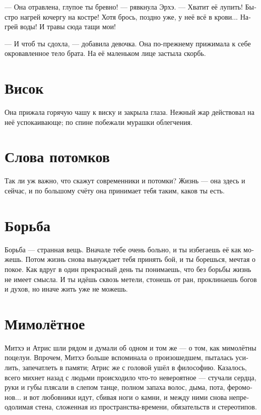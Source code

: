 \documentclass[a4paper,12pt,fleqn]{book}\usepackage{polyglossia}\setdefaultlanguage[babelshorthands=true]{russian}\setotherlanguage{english}\defaultfontfeatures{Ligatures=TeX,Mapping=tex-text}\usepackage{xcolor}\newcommand{\ml}[3]{#2}
\begin{document}
{--- Она отравлена, глупое ты бревно! --- рявкнула Эрхэ.
--- Хватит её лупить!
Быстро нагрей кочергу на костре!
Хотя брось, поздно уже, у неё всё в крови...
Нагрей воды!
И травы сюда тащи мои!

--- И чтоб ты сдохла, --- добавила девочка.
Она по-прежнему прижимала к себе окровавленное тело брата.
На её маленьком лице застыла скорбь.

\section{Висок}

Она прижала горячую чашу к виску и закрыла глаза.
Нежный жар действовал на неё успокаивающе;
по спине побежали мурашки облегчения.

\section{Слова потомков}

Так ли уж важно, что скажут современники и потомки?
Жизнь --- она здесь и сейчас, и по большому счёту она принимает тебя таким, каков ты есть.

\section{Борьба}

Борьба --- странная вещь.
Вначале тебе очень больно, и ты избегаешь её как можешь.
Потом жизнь снова вынуждает тебя принять бой, и ты борешься, мечтая о покое.
Как вдруг в один прекрасный день ты понимаешь, что без борьбы жизнь не имеет смысла.
И ты идёшь сквозь метели, стонешь от ран, проклинаешь богов и духов, но иначе жить уже не можешь.

\section{Мимолётное}

Митхэ и Атрис шли рядом и думали об одном и том же --- о том, как мимолётны поцелуи.
Впрочем, Митхэ больше вспоминала о произошедшем, пыталась усилить, запечатлеть в памяти;
Атрис же с головой ушёл в философию.
Казалось, всего михнет назад с людьми происходило что-то невероятное --- стучали сердца, руки и губы плясали в слепом танце, полном запаха волос, дыма, пота, феромонов... и вот любовники идут, сбивая ноги о камни, и между ними снова непреодолимая стена, сложенная из пространства-времени, обязательств и стереотипов.

}
\end{document}
